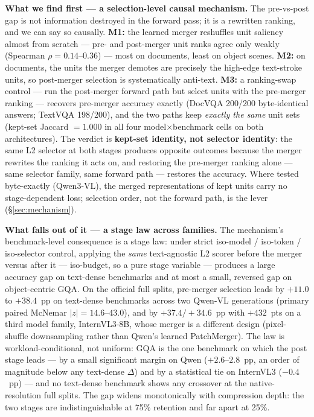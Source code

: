\documentclass[sigconf,review,anonymous]{acmart}
\begin{document}
\textbf{What we find first --- a selection-level causal mechanism.} The
pre-vs-post gap is not information destroyed in the forward pass; it is a
rewritten ranking, and we can say so causally. \textbf{M1:} the learned merger
reshuffles unit saliency almost from scratch --- pre- and post-merger unit
ranks agree only weakly (Spearman $\rho = 0.14$--$0.36$) --- most on documents,
least on object scenes. \textbf{M2:} on documents, the units the merger demotes
are precisely the high-edge text-stroke units, so post-merger selection is
systematically anti-text. \textbf{M3:} a ranking-swap control --- run the
post-merger forward path but select units with the pre-merger ranking ---
recovers pre-merger accuracy exactly (DocVQA 200/200 byte-identical answers;
TextVQA 198/200), and the two paths keep \emph{exactly the same} unit sets
(kept-set Jaccard $= 1.000$ in all four model$\times$benchmark cells on both
architectures). The verdict is \textbf{kept-set identity, not selector
identity}: the same L2 selector at both stages produces opposite outcomes
because the merger rewrites the ranking it acts on, and restoring the
pre-merger ranking alone --- same selector family, same forward path ---
restores the accuracy. Where tested byte-exactly (Qwen3-VL), the merged
representations of kept units carry no stage-dependent loss; selection order,
not the forward path, is the lever (\S\ref{sec:mechanism}).

\textbf{What falls out of it --- a stage law across families.} The mechanism's
benchmark-level consequence is a stage law: under strict iso-model / iso-token /
iso-selector control, applying the \emph{same} text-agnostic L2 scorer before
the merger versus after it --- iso-budget, so a pure stage variable ---
produces a large accuracy gap on text-dense benchmarks and at most a small,
reversed gap on object-centric GQA. On the official full splits, pre-merger
selection leads by $+11.0$ to $+38.4$~pp on text-dense benchmarks across two
Qwen-VL generations (primary paired McNemar $|z| = 14.6$--$43.0$), and by
$+37.4 / +34.6$~pp with $+432$~pts on a third model family, InternVL3-8B,
whose merger is a different design (pixel-shuffle downsampling rather than
Qwen's learned PatchMerger). The law is workload-conditional, not uniform: GQA
is the one benchmark on which the post stage leads --- by a small significant
margin on Qwen ($+2.6$--$2.8$~pp, an order of magnitude below any text-dense
$\Delta$) and by a statistical tie on InternVL3 ($-0.4$~pp) --- and no
text-dense benchmark shows any crossover at the native-resolution full splits.
The gap widens monotonically with compression depth: the two stages are
indistinguishable at 75\% retention and far apart at 25\%.
\end{document}
